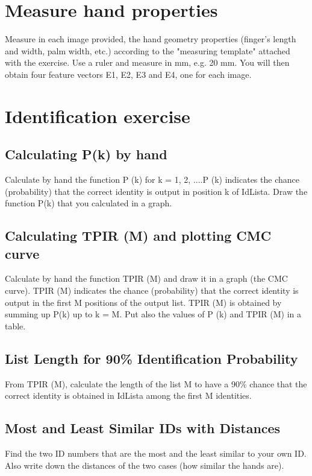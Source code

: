 \documentclass[a4paper,12pt]{article}
\begin{document}
\newpage
\section{Measure hand properties}
Measure in each image provided, the hand geometry properties (finger’s length and width, palm width, etc.) according to the "measuring template" attached with the exercise. Use a ruler and measure in mm, e.g. 20 mm. You will then obtain four feature vectors E1, E2, E3 and E4, one for each image.


\section{Identification exercise}

\subsection{Calculating P(k) by hand}
Calculate by hand the function P (k) for k = 1, 2, ....P (k) indicates the chance (probability) that the correct identity is output in position k of IdLista. Draw the function P(k) that you calculated in a graph.

\subsection{Calculating TPIR (M) and plotting CMC curve}
Calculate by hand the function TPIR (M) and draw it in a graph (the CMC curve). 
TPIR (M) indicates the chance (probability) that the correct identity is output in the first M positions of the output list.  TPIR (M) is obtained by summing up P(k) up to k = M.
Put also the values of P (k) and TPIR (M) in a table.


\subsection{List Length for 90\% Identification Probability}
From TPIR (M), calculate the length of the list M to have a 90\% chance that the correct identity is obtained in IdLista among the first M identities.

\subsection{Most and Least Similar IDs with Distances}
Find the two ID numbers that are the most and the least similar to your own ID. Also write down the distances of the two cases (how similar the hands are).
\end{document}
